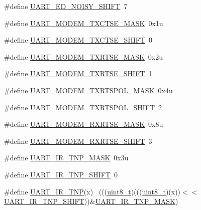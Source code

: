 \begin{DoxyCompactItemize}
\item 
\#define \hyperlink{group___u_a_r_t___register___masks_gab366fc1267a46213bc540e93c2603a6c}{U\+A\+R\+T\+\_\+\+E\+D\+\_\+\+N\+O\+I\+S\+Y\+\_\+\+S\+H\+I\+FT}~7
\item 
\#define \hyperlink{group___u_a_r_t___register___masks_ga00c7ea6d89eec98c2f6cc98651712c00}{U\+A\+R\+T\+\_\+\+M\+O\+D\+E\+M\+\_\+\+T\+X\+C\+T\+S\+E\+\_\+\+M\+A\+SK}~0x1u
\item 
\#define \hyperlink{group___u_a_r_t___register___masks_gafa34ecab8ca4ea8d72e3c42d846ce96d}{U\+A\+R\+T\+\_\+\+M\+O\+D\+E\+M\+\_\+\+T\+X\+C\+T\+S\+E\+\_\+\+S\+H\+I\+FT}~0
\item 
\#define \hyperlink{group___u_a_r_t___register___masks_gabcfa3a03c9114f74c35bb22c13261c1b}{U\+A\+R\+T\+\_\+\+M\+O\+D\+E\+M\+\_\+\+T\+X\+R\+T\+S\+E\+\_\+\+M\+A\+SK}~0x2u
\item 
\#define \hyperlink{group___u_a_r_t___register___masks_gadc29d3e7148a1f7a895a1db6442cc5b8}{U\+A\+R\+T\+\_\+\+M\+O\+D\+E\+M\+\_\+\+T\+X\+R\+T\+S\+E\+\_\+\+S\+H\+I\+FT}~1
\item 
\#define \hyperlink{group___u_a_r_t___register___masks_ga83617aa9166494f2dbed5da69b5ae0ef}{U\+A\+R\+T\+\_\+\+M\+O\+D\+E\+M\+\_\+\+T\+X\+R\+T\+S\+P\+O\+L\+\_\+\+M\+A\+SK}~0x4u
\item 
\#define \hyperlink{group___u_a_r_t___register___masks_ga3b069f2bfe05099b3fdb47e872c6b2e6}{U\+A\+R\+T\+\_\+\+M\+O\+D\+E\+M\+\_\+\+T\+X\+R\+T\+S\+P\+O\+L\+\_\+\+S\+H\+I\+FT}~2
\item 
\#define \hyperlink{group___u_a_r_t___register___masks_gaceb719e6bb4624e1b8a5a922bd594778}{U\+A\+R\+T\+\_\+\+M\+O\+D\+E\+M\+\_\+\+R\+X\+R\+T\+S\+E\+\_\+\+M\+A\+SK}~0x8u
\item 
\#define \hyperlink{group___u_a_r_t___register___masks_gabbe55b53dd5c048084d8c9341e522d90}{U\+A\+R\+T\+\_\+\+M\+O\+D\+E\+M\+\_\+\+R\+X\+R\+T\+S\+E\+\_\+\+S\+H\+I\+FT}~3
\item 
\#define \hyperlink{group___u_a_r_t___register___masks_ga635e77629e602b47032f8d35dda0f442}{U\+A\+R\+T\+\_\+\+I\+R\+\_\+\+T\+N\+P\+\_\+\+M\+A\+SK}~0x3u
\item 
\#define \hyperlink{group___u_a_r_t___register___masks_gafc08f087483347c37c3051f6c86d2beb}{U\+A\+R\+T\+\_\+\+I\+R\+\_\+\+T\+N\+P\+\_\+\+S\+H\+I\+FT}~0
\item 
\#define \hyperlink{group___u_a_r_t___register___masks_ga0b1313b20737a0cc2211c37b6627cead}{U\+A\+R\+T\+\_\+\+I\+R\+\_\+\+T\+NP}(x)                                                  ~(((\hyperlink{_p_e___types_8h_aba7bc1797add20fe3efdf37ced1182c5}{uint8\+\_\+t})(((\hyperlink{_p_e___types_8h_aba7bc1797add20fe3efdf37ced1182c5}{uint8\+\_\+t})(x))$<$$<$\hyperlink{group___u_a_r_t___register___masks_gafc08f087483347c37c3051f6c86d2beb}{U\+A\+R\+T\+\_\+\+I\+R\+\_\+\+T\+N\+P\+\_\+\+S\+H\+I\+FT}))\&\hyperlink{group___u_a_r_t___register___masks_ga635e77629e602b47032f8d35dda0f442}{U\+A\+R\+T\+\_\+\+I\+R\+\_\+\+T\+N\+P\+\_\+\+M\+A\+SK})
$$
\end{DoxyCompactItemize}
